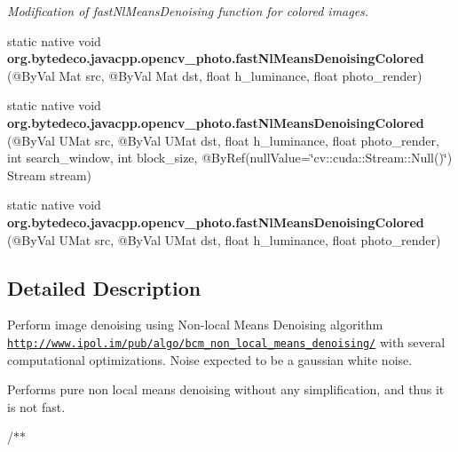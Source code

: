 \begin{DoxyCompactItemize}
\begin{DoxyCompactList}\small\item\em Modification of fast\+Nl\+Means\+Denoising function for colored images. \end{DoxyCompactList}\item 
\mbox{\label{group__photo__denoise_ga00dd39f36e3ef9c6e77965f6b601272f}} 
static native void {\bfseries org.\+bytedeco.\+javacpp.\+opencv\+\_\+photo.\+fast\+Nl\+Means\+Denoising\+Colored} (@By\+Val Mat src, @By\+Val Mat dst, float h\+\_\+luminance, float photo\+\_\+render)
\item 
\mbox{\label{group__photo__denoise_ga095fb33c91662ec8bbb68ecc4a9e3856}} 
static native void {\bfseries org.\+bytedeco.\+javacpp.\+opencv\+\_\+photo.\+fast\+Nl\+Means\+Denoising\+Colored} (@By\+Val U\+Mat src, @By\+Val U\+Mat dst, float h\+\_\+luminance, float photo\+\_\+render, int search\+\_\+window, int block\+\_\+size, @By\+Ref(null\+Value=\char`\"{}cv\+::cuda\+::\+Stream\+::\+Null()\char`\"{}) Stream stream)
\item 
\mbox{\label{group__photo__denoise_ga1f5420ffdac125cd2930194ecdc1e498}} 
static native void {\bfseries org.\+bytedeco.\+javacpp.\+opencv\+\_\+photo.\+fast\+Nl\+Means\+Denoising\+Colored} (@By\+Val U\+Mat src, @By\+Val U\+Mat dst, float h\+\_\+luminance, float photo\+\_\+render)
\end{DoxyCompactItemize}


\subsection{Detailed Description}
Perform image denoising using Non-\/local Means Denoising algorithm \href{http://www.ipol.im/pub/algo/bcm_non_local_means_denoising/}{\tt http\+://www.\+ipol.\+im/pub/algo/bcm\+\_\+non\+\_\+local\+\_\+means\+\_\+denoising/} with several computational optimizations. Noise expected to be a gaussian white noise. 

Performs pure non local means denoising without any simplification, and thus it is not fast.

/$\ast$$\ast$


